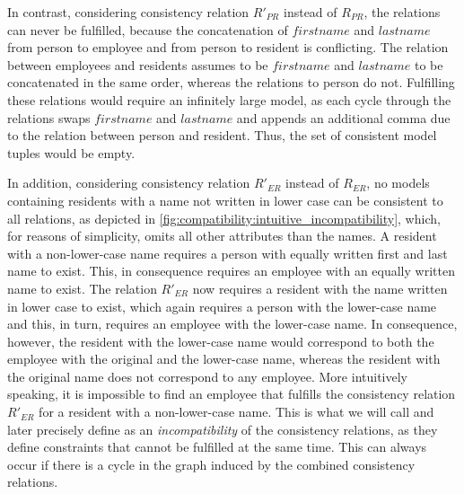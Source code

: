 In contrast, considering consistency relation $R'_{PR}$ instead of $R_{PR}$, the relations can never be fulfilled, because the concatenation of $firstname$ and $lastname$ from person to employee and from person to resident is conflicting.
The relation between employees and residents assumes to be $firstname$ and $lastname$ to be concatenated in the same order, whereas the relations to person do not.
Fulfilling these relations would require an infinitely large model, as each cycle through the relations swaps $firstname$ and $lastname$ and appends an additional comma due to the relation between person and resident.
Thus, the set of consistent model tuples would be empty.

In addition, considering consistency relation $R'_{ER}$ instead of $R_{ER}$, no models containing residents with a name not written in lower case can be consistent to all relations, as depicted in \autoref{fig:compatibility:intuitive_incompatibility}, which, for reasons of simplicity, omits all other attributes than the names.
A resident with a non-lower-case name requires a person with equally written first and last name to exist.
This, in consequence requires an employee with an equally written name to exist.
The relation $R'_{ER}$ now requires a resident with the name written in lower case to exist, which again requires a person with the lower-case name and this, in turn, requires an employee with the lower-case name.
In consequence, however, the resident with the lower-case name would correspond to both the employee with the original and the lower-case name, whereas the resident with the original name does not correspond to any employee.
More intuitively speaking, it is impossible to find an employee that fulfills the consistency relation $R'_{ER}$ for a resident with a non-lower-case name.
This is what we will call and later precisely define as an \emph{incompatibility} of the consistency relations, as they define constraints that cannot be fulfilled at the same time.
This can always occur if there is a cycle in the graph induced by the combined consistency relations.

